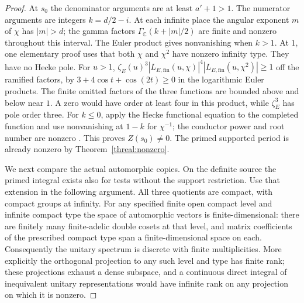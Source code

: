 \begin{proof}
At \(s_0\) the denominator arguments are at least \(a'+1>1\).
The numerator arguments are integers \(k=d/2-i\).
At each infinite place the angular exponent \(m\) of \(\chi\)
has \(|m|>d\); the gamma factors
\(\Gamma_{\mathbb C}(k+|m|/2)\) are finite and nonzero throughout
this interval. The Euler product gives nonvanishing when \(k>1\).
At \(1\), one elementary proof uses that both \(\chi\) and
\(\chi^2\) have nonzero infinity type. They have no Hecke pole.
For \(u>1\),
\(\zeta_E(u)^3|L_{E,\mathrm{fin}}(u,\chi)|^4
 |L_{E,\mathrm{fin}}(u,\chi^2)|\ge1\) off the ramified factors,
by \(3+4\cos t+\cos(2t)\ge0\) in the logarithmic Euler products.
The finite omitted factors of the three functions are bounded
above and below near \(1\). A zero would have order at least four
in this product, while \(\zeta_E^3\) has pole order three. For
\(k\le0\), apply the Hecke functional equation to the completed
function and use nonvanishing at \(1-k\) for \(\chi^{-1}\);
the conductor power and root number are nonzero
\cite{tateThesis}. This proves
\(Z(s_0)\ne0\). The primed supported period is already nonzero
by Theorem~\ref{threal:nonzero}.

We next compare the actual automorphic copies. On the definite
source the primed integral exists also for tests without the
support restriction. Use that extension in the following argument.
All three quotients are compact, with compact groups at infinity.
For any specified finite open compact level and infinite compact
type the space of automorphic vectors is finite-dimensional:
there are finitely many finite-adelic double cosets at that
level, and matrix coefficients of the prescribed compact type
span a finite-dimensional space on each. Consequently the unitary
spectrum is discrete with finite multiplicities. More explicitly
the orthogonal projection to any such level and type has finite
rank; these projections exhaust a dense subspace, and a continuous
direct integral of inequivalent unitary representations would have
infinite rank on any projection on which it is nonzero.


\end{proof}
